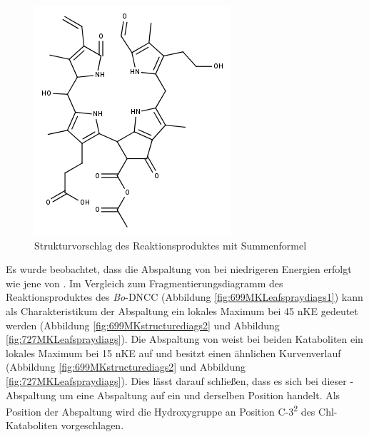\begin{figure}[!htbp]
  \centering
  \includegraphics[scale=0.6]{figures/Kapitel4/Kataboliten/fragmentation_structures/VWA_Katabolit_727.png}
  \caption[Strukturvorschlag des Reaktionsproduktes von \textit{Bo}-NCC-3, Quelle: Autor]{Strukturvorschlag des Reaktionsproduktes mit Summenformel }
  \label{fig:727MKstructure}
\end{figure}

Es wurde beobachtet, dass die Abspaltung von  bei niedrigeren Energien erfolgt wie jene von . Im Vergleich zum Fragmentierungsdiagramm des Reaktionsproduktes des \textit{Bo}-DNCC (Abbildung \ref{fig:699MKLeafspraydiags1}) kann als Charakteristikum der  Abspaltung ein lokales Maximum bei 45 \gls{nKE} gedeutet werden (Abbildung \ref{fig:699MKstructurediags2} und Abbildung \ref{fig:727MKLeafspraydiags}). Die Abspaltung von  weist bei beiden Kataboliten ein lokales Maximum bei 15 \gls{nKE} auf und besitzt einen ähnlichen Kurvenverlauf (Abbildung \ref{fig:699MKstructurediags2} und Abbildung \ref{fig:727MKLeafspraydiags}). Dies lässt darauf schließen, dass es sich bei dieser -Abspaltung um eine Abspaltung auf ein und derselben Position handelt. Als Position der Abspaltung wird die Hydroxygruppe an Position C-3\textsuperscript{2} des Chl-Kataboliten vorgeschlagen. 

